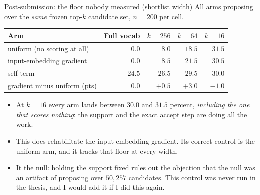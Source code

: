 \documentclass{beamer}
\begin{document}
\begin{frame}[noframenumbering]{Post-submission: the floor nobody measured (shortlist width)}
  \small
  All arms proposing over the \emph{same} frozen top-$k$ candidate set, $n=200$ per cell.
  \begin{center}
  \begin{tabular}{lrrrr}
    \toprule
    Arm & Full vocab & $k=256$ & $k=64$ & $k=16$ \\
    \midrule
    uniform (no scoring at all) & $0.0$ & $8.0$ & $18.5$ & $\bm{31.5}$ \\
    input-embedding gradient    & $0.0$ & $8.5$ & $21.5$ & $\bm{30.5}$ \\
    self term                   & $24.5$ & $26.5$ & $29.5$ & $30.0$ \\
    \midrule
    gradient minus uniform (pts) & $0.0$ & $+0.5$ & $+3.0$ & $-1.0$ \\
    \bottomrule
  \end{tabular}
  \end{center}
  \vspace{0.3em}
  \begin{itemize}\small
    \item At $k=16$ every arm lands between $30.0$ and $31.5$ percent, \emph{including the one
      that scores nothing}: the support and the exact accept step are doing all the work.
    \item This does  rehabilitate the input-embedding gradient. Its correct
      control is the uniform arm, and it tracks that floor at every width.
    \item It  the null: holding the support fixed rules out the objection
      that the null was an artifact of proposing over $50{,}257$ candidates. This control was
      never run in the thesis, and I would add it if I did this again.
  \end{itemize}
\end{frame}
\end{document}
